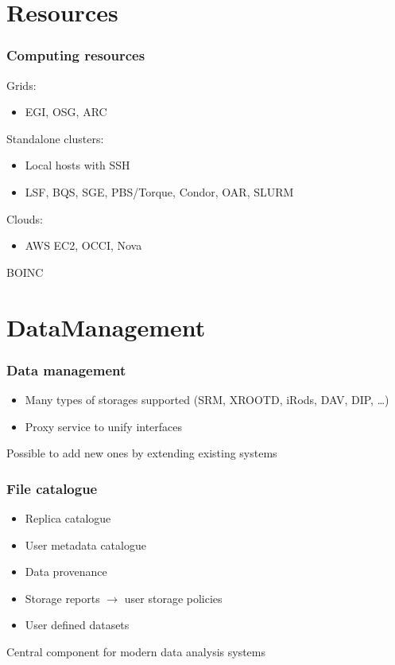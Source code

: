 \documentclass[14pt]{beamer}
\begin{document}
\section{Resources}
\begin{frame}
\frametitle{Computing resources}
Grids:
\begin{itemize}
\item EGI, OSG, ARC
\end{itemize}
\pause
Standalone clusters:
\begin{itemize}
\item Local hosts with SSH
\item LSF, BQS, SGE, PBS/Torque, Condor, OAR, SLURM
\end{itemize}
\pause
Clouds:
\begin{itemize}
\item AWS EC2, OCCI, Nova
\end{itemize}
\pause
BOINC
\end{frame}

\section{DataManagement}
\begin{frame}
\frametitle{Data management}
\begin{itemize}
\item Many types of storages supported (SRM, XROOTD, iRods, DAV, DIP, \ldots)
\item Proxy service to unify interfaces
\end{itemize}
Possible to add new ones by extending existing systems
\end{frame}

\begin{frame}
\frametitle{File catalogue}
\begin{itemize}
\item Replica catalogue
\item User metadata catalogue
\item Data provenance
\item Storage reports $\rightarrow$ user storage policies
\item User defined datasets
\end{itemize}
\alert{Central component for modern data analysis systems}
\end{frame}
\end{document}
